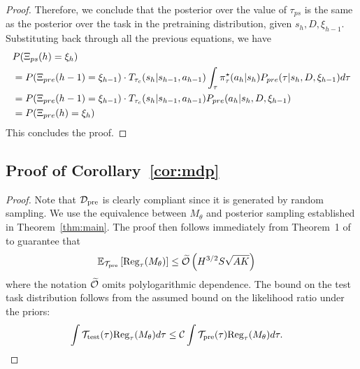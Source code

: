 \begin{proof}
Therefore, we conclude that the posterior over the value of $\tau_{ps}$ is the same as the posterior over the task in the pretraining distribution, given $s_h, D, \xi_{h - 1}$. Substituting back through all the previous equations, we have
\begin{align}
    & P(\Xi_{ps}(h) = \xi_h) \\
    & = P(\Xi_{pre}(h - 1) = \xi_{h - 1} ) \cdot T_{\tau_c}(s_h | s_{h - 1}, a_{h - 1})\int_{\tau} \pi^{\star}_\tau(a_h| s_h) P_{pre}(\tau | s_h, D, \xi_{h - 1}) d \tau \\
    & = P(\Xi_{pre}(h - 1) = \xi_{h - 1} ) \cdot T_{\tau_c}(s_h | s_{h - 1}, a_{h - 1}) P_{pre}(a_h | s_h, D, \xi_{h - 1}) \\
    & = P(\Xi_{pre}(h) = \xi_h)
\end{align}
This concludes the proof.



     
   
\end{proof}












\subsection{Proof of Corollary~\ref{cor:mdp}}

\cormdp*

\begin{proof} Note that $\mathcal{D}_{\text{pre}}$ is clearly compliant since it is generated by random sampling.
We use the equivalence between $M_{\theta}$ and posterior sampling established in Theorem~\ref{thm:main}.
The proof then follows immediately from Theorem~1 of \cite{osband2013more} to guarantee that
\begin{align}
    \mathbb{E}_{{\mathcal{T}}_{\text{pre}}} \left[ \text{Reg}_\tau(M_{\theta})\right] & \leq \widetilde{\mathcal{O}} \left(H^{3/2}S\sqrt{A K}\right)
\end{align}
where the notation $\widetilde{\mathcal{O}}$ omits polylogarithmic dependence. The bound on the test task distribution follows from the assumed bound on the likelihood ratio under the priors:
\begin{align}
     \int {\mathcal{T}}_{\text{test}}(\tau) \text{Reg}_\tau(M_{\theta})  d\tau  & \leq  \mathcal{C} \int {\mathcal{T}}_{\text{pre}}(\tau) \text{Reg}_\tau(M_{\theta})  d\tau.
\end{align}
\end{proof}

